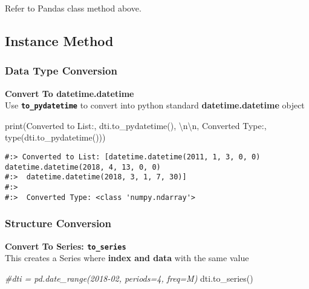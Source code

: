 \documentclass[
]{book}
\newenvironment{Shaded}{\begin{snugshade}}{\end{snugshade}}
\newcommand{\BuiltInTok}[1]{#1}
\newcommand{\CharTok}[1]{\textcolor[rgb]{0.5,0.5,0.5}{#1}}
\newcommand{\CommentTok}[1]{\textcolor[rgb]{0.37,0.37,0.37}{\textit{#1}}}
\newcommand{\NormalTok}[1]{#1}
\newcommand{\StringTok}[1]{\textcolor[rgb]{0.5,0.5,0.5}{#1}}
\begin{document}
Refer to Pandas class method above.

\hypertarget{instance-method-4}{%
\subsection{Instance Method}\label{instance-method-4}}

\hypertarget{data-type-conversion}{%
\subsubsection{Data Type Conversion}\label{data-type-conversion}}

\textbf{Convert To datetime.datetime}\\
Use \textbf{\texttt{to\_pydatetime}} to convert into python standard \textbf{datetime.datetime} object

\begin{Shaded}
\begin{Highlighting}[]
\BuiltInTok{print}\NormalTok{(}\StringTok{\textquotesingle{}Converted to List:\textquotesingle{}}\NormalTok{, dti.to\_pydatetime(), }\StringTok{\textquotesingle{}}\CharTok{\textbackslash{}n\textbackslash{}n}\StringTok{\textquotesingle{}}\NormalTok{,}
      \StringTok{\textquotesingle{}Converted Type:\textquotesingle{}}\NormalTok{,    }\BuiltInTok{type}\NormalTok{(dti.to\_pydatetime()))}
\end{Highlighting}
\end{Shaded}

\begin{verbatim}
#:> Converted to List: [datetime.datetime(2011, 1, 3, 0, 0) datetime.datetime(2018, 4, 13, 0, 0)
#:>  datetime.datetime(2018, 3, 1, 7, 30)] 
#:> 
#:>  Converted Type: <class 'numpy.ndarray'>
\end{verbatim}

\hypertarget{structure-conversion}{%
\subsubsection{Structure Conversion}\label{structure-conversion}}

\textbf{Convert To Series: \texttt{to\_series}}\\
This creates a Series where \textbf{index and data} with the same value

\begin{Shaded}
\begin{Highlighting}[]
\CommentTok{\#dti = pd.date\_range(\textquotesingle{}2018{-}02\textquotesingle{}, periods=4, freq=\textquotesingle{}M\textquotesingle{})}
\NormalTok{dti.to\_series()}
\end{Highlighting}
\end{Shaded}
\end{document}
